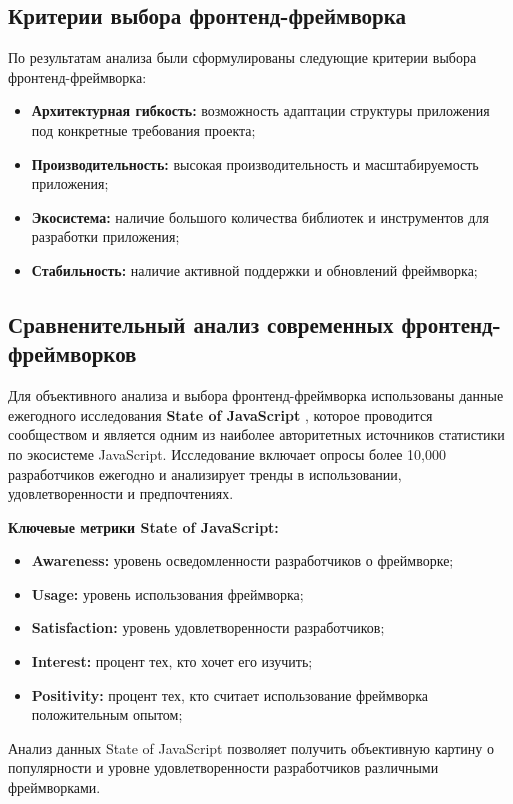 \subsection{Критерии выбора фронтенд-фреймворка}

По результатам анализа были сформулированы следующие критерии выбора фронтенд-фреймворка:

\begin{itemize}
	\item \textbf{Архитектурная гибкость:} возможность адаптации структуры приложения под конкретные требования проекта;
	\item \textbf{Производительность:} высокая производительность и масштабируемость приложения;
	\item \textbf{Экосистема:} наличие большого количества библиотек и инструментов для разработки приложения;
	\item \textbf{Стабильность:} наличие активной поддержки и обновлений фреймворка;
\end{itemize}

\subsection{Сравненительный анализ современных фронтенд-фреймворков}
Для объективного анализа и выбора фронтенд-фреймворка использованы данные ежегодного 
исследования \textbf{State of JavaScript} \cite{state-of-javascript}, которое проводится сообществом и является
одним из наиболее авторитетных источников статистики по экосистеме JavaScript. Исследование
включает опросы более 10,000 разработчиков ежегодно и анализирует тренды в использовании,
удовлетворенности и предпочтениях.

\textbf{Ключевые метрики State of JavaScript:}
\begin{itemize}
	\item \textbf{Awareness:} уровень осведомленности разработчиков о фреймворке;
	\item \textbf{Usage:} уровень использования фреймворка;
	\item \textbf{Satisfaction:} уровень удовлетворенности разработчиков;
	\item \textbf{Interest:} процент тех, кто хочет его изучить;
	\item \textbf{Positivity:} процент тех, кто считает использование фреймворка положительным опытом;
\end{itemize}

Анализ данных State of JavaScript позволяет получить объективную картину о популярности и 
уровне удовлетворенности разработчиков различными фреймворками.

